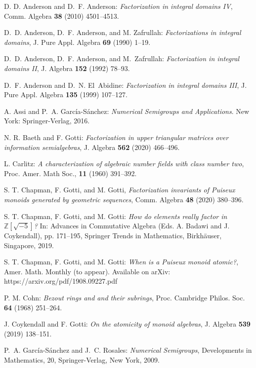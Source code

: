 \documentclass[12pt]{amsart}
\theoremstyle{definition}
\numberwithin{equation}{section}
\newcommand\zz{\mathbb{Z}}
\begin{document}
\begin{thebibliography}{20}
	
	 D. D. Anderson and D.~F. Anderson: \emph{Factorization in integral domains IV}, Comm. Algebra {\bf 38} (2010) 4501--4513.
	
	 D.~D. Anderson, D.~F. Anderson, and M. Zafrullah: \emph{Factorizations in integral domains}, J. Pure Appl. Algebra \textbf{69} (1990) 1--19.
	
	 D.~D. Anderson, D.~F. Anderson, and M.~Zafrullah: \emph{Factorization in integral domains II}, J. Algebra {\bf 152} (1992) 78--93.
	
	 D.~F. Anderson and D.~N. El~Abidine: \emph{Factorization in integral domains III}, J. Pure Appl. Algebra {\bf 135} (1999) 107--127.

	 A. Assi and P.~A. Garc\'ia-S\'anchez: \emph{Numerical Semigroups and Applications}. New York: Springer-Verlag, 2016.

	 N. R. Baeth and F. Gotti: \emph{Factorization in upper triangular matrices over information semialgebras}, J. Algebra \textbf{562} (2020) 466--496.

	 L. Carlitz: \emph{A characterization of algebraic number fields with class number two}, Proc. Amer. Math Soc., \textbf{11} (1960) 391--392.

	 S. T. Chapman, F. Gotti, and M. Gotti, \emph{Factorization invariants of Puiseux monoids generated by geometric sequences}, Comm. Algebra \textbf{48} (2020) 380--396.

	 S. T. Chapman, F. Gotti, and M. Gotti: \emph{How do elements really factor in $\zz[\sqrt{-5}]$?} In: Advances in Commutative Algebra (Eds. A. Badawi and J. Coykendall), pp. 171–195, Springer
	Trends in Mathematics, Birkh\"auser, Singapore, 2019.

	 S. T. Chapman, F. Gotti, and M.  Gotti: \emph{When is a Puiseux monoid atomic?}, Amer. Math. Monthly (to appear). Available on arXiv: https://arxiv.org/pdf/1908.09227.pdf
	
	 P. M. Cohn: \emph{Bezout rings and and their subrings}, Proc. Cambridge Philos. Soc. {\bf 64} (1968) 251--264.
	
	 J. Coykendall and F. Gotti: \emph{On the atomicity of monoid algebras}, J. Algebra \textbf{539} (2019) 138--151.
	
	 P.~A. Garc\'ia-S\'anchez and J.~C. Rosales: \emph{Numerical Semigroups}, Developments in Mathematics, 20, Springer-Verlag, New York, 2009.
	

\end{thebibliography}
\end{document}
